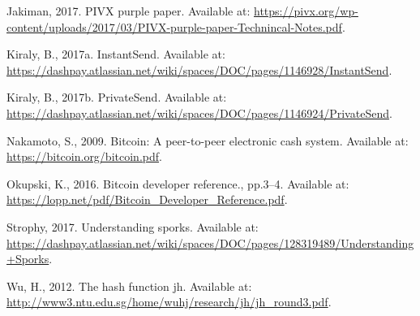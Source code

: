 \documentclass[11pt,a4paperpaper,]{report}
\begin{document}
\hypertarget{ref-PIVX}{}
Jakiman, 2017. PIVX purple paper. Available at:
\url{https://pivx.org/wp-content/uploads/2017/03/PIVX-purple-paper-Technincal-Notes.pdf}.

\hypertarget{ref-InstantSend}{}
Kiraly, B., 2017a. InstantSend. Available at:
\url{https://dashpay.atlassian.net/wiki/spaces/DOC/pages/1146928/InstantSend}.

\hypertarget{ref-PrivateSend}{}
Kiraly, B., 2017b. PrivateSend. Available at:
\url{https://dashpay.atlassian.net/wiki/spaces/DOC/pages/1146924/PrivateSend}.

\hypertarget{ref-Bitcoin}{}
Nakamoto, S., 2009. Bitcoin: A peer-to-peer electronic cash system.
Available at: \url{https://bitcoin.org/bitcoin.pdf}.

\hypertarget{ref-Bitcoindevreference}{}
Okupski, K., 2016. Bitcoin developer reference., pp.3--4. Available at:
\url{https://lopp.net/pdf/Bitcoin_Developer_Reference.pdf}.

\hypertarget{ref-Sporks}{}
Strophy, 2017. Understanding sporks. Available at:
\url{https://dashpay.atlassian.net/wiki/spaces/DOC/pages/128319489/Understanding+Sporks}.

\hypertarget{ref-JH}{}
Wu, H., 2012. The hash function jh. Available at:
\url{http://www3.ntu.edu.sg/home/wuhj/research/jh/jh_round3.pdf}.
\end{document}
